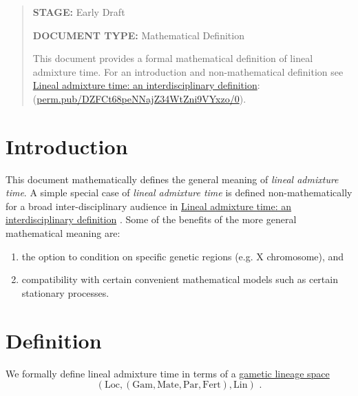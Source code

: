 

\newcommand{\dom}[1]{\operatorname{dom}{ #1}}
\newcommand{\mathstop}{\text{ .}}

\newcommand{\Gam}{\mathrm{Gam}}
\newcommand{\Loc}{\mathrm{Loc}}
\newcommand{\Lin}{\mathrm{Lin}}
\newcommand{\Mate}{\mathrm{Mate}}
\newcommand{\Par}{\mathrm{Par}}
\newcommand{\Fert}{\mathrm{Fert}}
\newcommand{\Mrlt}{\mathrm{Mrlt}}


\begin{abstract}
\textbf{STAGE:} Early Draft

\textbf{DOCUMENT TYPE:} Mathematical Definition

This document provides a formal mathematical definition of lineal
admixture time. For an introduction and non-mathematical definition see
\href{https://perm.pub/DZFCt68peNNajZ34WtZni9VYxzo/0}{Lineal admixture time: an interdisciplinary definition}:
\\ (\href{https://perm.pub/DZFCt68peNNajZ34WtZni9VYxzo/0}{perm.pub/DZFCt68peNNajZ34WtZni9VYxzo/0}).
\end{abstract}

\section{Introduction}

This document mathematically defines the general meaning of \emph{lineal admixture time}.
A simple special case of \emph{lineal admixture time} is defined non-mathematically
for a broad inter-disciplinary audience in
\href{https://perm.pub/DZFCt68peNNajZ34WtZni9VYxzo/0}{Lineal admixture time: an interdisciplinary definition}
\cite{dsi:DZ/0}.
Some of the benefits of the more general mathematical meaning are:
\begin{enumerate}
\item the option to condition on specific genetic regions (e.g. X chromosome), and
\item compatibility with certain convenient mathematical models such as certain stationary
processes.
\end{enumerate}


\section{Definition}

We formally define lineal admixture time in terms of a
\href{https://popgen.es/0iV47kWzQAuyONrIDG538k3x3Qc/0.3/}{gametic
lineage space}
\cite{dsi:0i/0.3}
\[
(\Loc, (\Gam, \Mate, \Par, \Fert), \Lin)
\mathstop
\]

